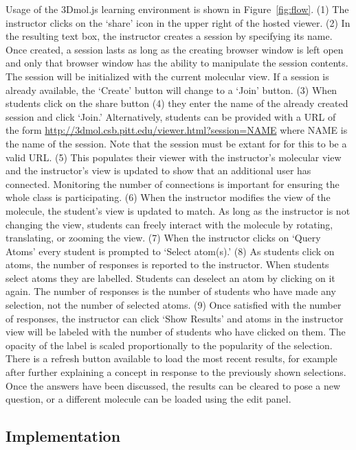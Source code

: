\documentclass[journal=jceda8,manuscript=article]{achemso}
\begin{document}
Usage of the 3Dmol.js learning environment is shown in Figure~\ref{fig:flow}.  (1) The instructor clicks on the `share' icon in the upper right of the hosted viewer. (2) In the resulting text box, the instructor creates a session by specifying its name.  Once created, a session lasts as long as the creating browser window is left open and only that browser window has the ability to manipulate the session contents.  The session will be initialized with the current molecular view. If a session is already available, the `Create' button will change to a `Join' button.  (3) When students click on the share button (4) they enter the name of the already created session and click `Join.'  Alternatively, students can be provided with a URL of the form \url{http://3dmol.csb.pitt.edu/viewer.html?session=NAME} where NAME is the name of the session.  Note that the session must be extant for for this to be a valid URL. (5) This populates their viewer with the instructor's molecular view and the instructor's view is updated to show that an additional user has connected.  Monitoring the number of connections is important for ensuring the whole class is participating.  (6) When the instructor modifies the view of the molecule, the student's view is updated to match.  As long as the instructor is not changing the view, students can freely interact with the molecule by rotating, translating, or zooming the view. (7) When the instructor clicks on `Query Atoms' every student is prompted to `Select atom(s).'  (8) As students click on atoms, the number of responses is reported to the instructor.  When students select atoms they are labelled.  Students can deselect an atom by clicking on it again.  The number of responses is the number of students who have made any selection, not the number of selected atoms. (9) Once satisfied with the number of responses, the instructor can click `Show Results' and atoms in the instructor view will be labeled with the number of students who have clicked on them.  The opacity of the label is scaled proportionally to the popularity of the selection.  There is a refresh button available to load the most recent results, for example after further explaining a concept in response to the previously shown selections.  Once the answers have been discussed, the results can be cleared to pose a new question, or a different molecule can be loaded using the edit panel.


\subsection{Implementation}
\end{document}
